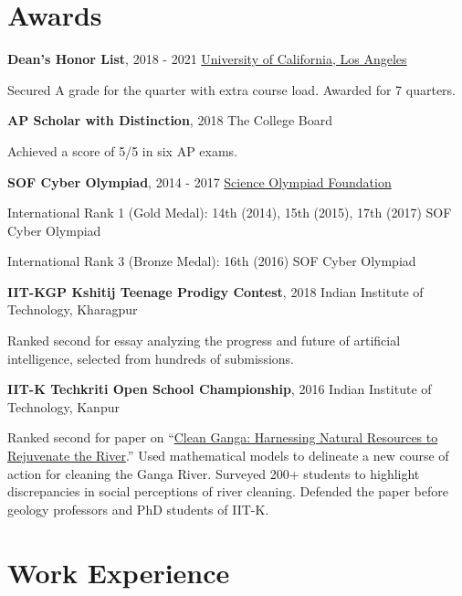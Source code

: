 \documentclass[letterpaper,10pt]{article}
\let\stdtextbf\textbf
\renewcommand{\textbf}[1]{{\fontfamily{bch}\selectfont\stdtextbf{#1}}}
\newlength{\blockgap}\setlength{\blockgap}{6pt}
\newenvironment{awarditem}[3]{%
    \textbf{#1}, #2 \hfill #3\par
}{%
    \par\vspace{\blockgap}
}
\begin{document}
\section{Awards}

\begin{awarditem}{Dean's Honor List}{2018 - 2021}{\href{https://www.ucla.edu/}{University of California, Los Angeles}}
    Secured A grade for the quarter with extra course load. Awarded for 7 quarters. \par
\end{awarditem}

\begin{awarditem}{AP Scholar with Distinction}{2018}{The College Board}
    Achieved a score of 5/5 in six AP exams. \par
\end{awarditem}

\begin{awarditem}{SOF Cyber Olympiad}{2014 - 2017}{\href{https://sofworld.org/}{Science Olympiad Foundation}}
    International Rank 1 (Gold Medal): 14th (2014), 15th (2015), 17th (2017) SOF Cyber Olympiad \par
    International Rank 3 (Bronze Medal): 16th (2016) SOF Cyber Olympiad \par
\end{awarditem}

\begin{awarditem}{IIT-KGP Kshitij Teenage Prodigy Contest}{2018}{Indian Institute of Technology, Kharagpur}
    Ranked second for essay analyzing the progress and future of artificial intelligence, selected from hundreds of submissions. \par
\end{awarditem}

\begin{awarditem}{IIT-K Techkriti Open School Championship}{2016}{Indian Institute of Technology, Kanpur}
    Ranked second for paper on ``\href{https://utsavm9.wordpress.com/techkriti/}{Clean Ganga: Harnessing Natural Resources to Rejuvenate the River}.'' Used mathematical models to delineate a new course of action for cleaning the Ganga River. Surveyed 200+ students to highlight discrepancies in social perceptions of river cleaning. Defended the paper before geology professors and PhD students of IIT-K. \par
\end{awarditem}


\newpage
\section{Work Experience}
\end{document}
